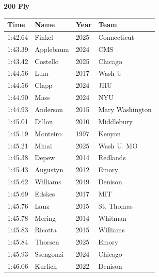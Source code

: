 \noindent\begin{minipage}[t]{0.98\textwidth}
\centering
\textbf{\textcolor{teamprimary}{200 Fly}}\par
\vspace{0.5em}
\centering
\small
\renewcommand{\arraystretch}{1.0}
\setlength{\tabcolsep}{4pt}
\begin{tabular}{@{}p{2.5cm}p{4.5cm}p{1.5cm}p{2.5cm}@{}}
\toprule
\textbf{Time} & \textbf{Name} & \textbf{Year} & \textbf{Team} \\
\midrule
1:42.64 & Finkel & 2025 & Connecticut \\
1:43.39 & Applebaum & 2024 & CMS \\
1:43.42 & Costello & 2025 & Chicago \\
1:44.56 & Lum & 2017 & Wash U \\
1:44.56 & Clapp & 2024 & JHU \\
1:44.90 & Mass & 2024 & NYU \\
1:44.93 & Anderson & 2015 & Mary Washington \\
1:45.01 & Dillon & 2010 & Middlebury \\
1:45.19 & Monteiro & 1997 & Kenyon \\
1:45.21 & Minai & 2025 & Wash U. MO \\
1:45.38 & Depew & 2014 & Redlands \\
1:45.43 & Augustyn & 2012 & Emory \\
1:45.62 & Williams & 2019 & Denison \\
1:45.69 & Edskes & 2017 & MIT \\
1:45.76 & Lanz & 2015 & St. Thomas \\
1:45.78 & Mering & 2014 & Whitman \\
1:45.83 & Ricotta & 2015 & Williams \\
1:45.84 & Thorsen & 2025 & Emory \\
1:45.93 & Ssengonzi & 2024 & Chicago \\
1:46.06 & Kurlich & 2022 & Denison \\
\bottomrule
\end{tabular}
\end{minipage}
\vspace{1.2em}
